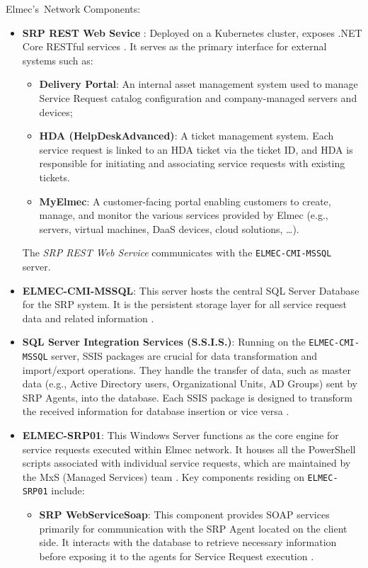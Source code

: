 Elmec's~Network Components:
\begin{itemize}
    \item \textbf{SRP REST Web Sevice} \cite{srp_webservicerest_git}:  Deployed on a Kubernetes cluster, exposes .NET Core RESTful services \cite{service_request_portal}. It serves as the primary interface for external systems such as:
    \begin{itemize}
        \item \textbf{Delivery Portal}: An internal asset management system used to manage Service Request catalog configuration and company-managed servers and devices;
        \item \textbf{HDA (HelpDeskAdvanced)}: A ticket management system. Each service request is linked to an HDA ticket via the ticket ID, and HDA is responsible for initiating and associating service requests with existing tickets.
        \item \textbf{MyElmec}: A customer-facing portal enabling customers to create, manage, and monitor the various services provided by Elmec (e.g., servers, virtual machines, DaaS devices, cloud solutions, \dots).
    \end{itemize}
    The \textit{SRP REST Web Service} communicates with the \texttt{ELMEC-CMI-MSSQL} server.
    \item \textbf{ELMEC-CMI-MSSQL}: This server hosts the central SQL Server Database for the SRP system. It is the persistent storage layer for all service request data and related information \cite{service_request_portal}.
    \item \textbf{SQL Server Integration Services (S.S.I.S.)}: Running on the \texttt{ELMEC-CMI-MSSQL} server, SSIS packages are crucial for data transformation and import/export operations. They handle the transfer of data, such as master data (e.g., Active Directory users, Organizational Units, AD Groups) sent by SRP Agents, into the database. Each SSIS package is designed to transform the received information for database insertion or vice versa \cite{service_request_portal}.
    \item \textbf{ELMEC-SRP01}: This Windows Server functions as the core engine for service requests executed within Elmec network. It houses all the PowerShell scripts associated with individual service requests, which are maintained by the MxS (Managed Services) team \cite{service_request_portal}. Key components residing on \texttt{ELMEC-SRP01} include:
    \begin{itemize}
        \item \textbf{SRP WebServiceSoap}: This component provides SOAP services primarily for communication with the SRP Agent located on the client side. It interacts with the database to retrieve necessary information before exposing it to the agents for Service Request execution \cite{srp_webservice_git}.

\end{itemize}
\end{itemize}
